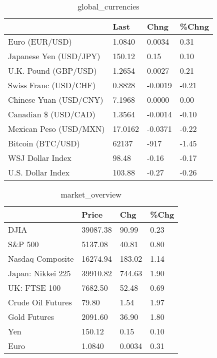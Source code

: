 \documentclass{article}%
\begin{document}
%


\begin{table}[htbp]%
\caption{global\_currencies}%
\centering%
\begin{adjustbox}{width=1\textwidth}%
\begin{tabular}{llll}
\toprule
                       &    Last &    Chng & \%Chng \\
\midrule
        Euro (EUR/USD) &  1.0840 &  0.0034 &  0.31 \\
Japanese Yen (USD/JPY) &  150.12 &    0.15 &  0.10 \\
  U.K. Pound (GBP/USD) &  1.2654 &  0.0027 &  0.21 \\
 Swiss Franc (USD/CHF) &  0.8828 & -0.0019 & -0.21 \\
Chinese Yuan (USD/CNY) &  7.1968 &  0.0000 &  0.00 \\
  Canadian \$ (USD/CAD) &  1.3564 & -0.0014 & -0.10 \\
Mexican Peso (USD/MXN) & 17.0162 & -0.0371 & -0.22 \\
     Bitcoin (BTC/USD) &   62137 &    -917 & -1.45 \\
      WSJ Dollar Index &   98.48 &   -0.16 & -0.17 \\
     U.S. Dollar Index &  103.88 &   -0.27 & -0.26 \\
\bottomrule
\end{tabular}
%
\end{adjustbox}%
\end{table}

%


\begin{table}[htbp]%
\caption{market\_overview}%
\centering%
\begin{adjustbox}{width=1\textwidth}%
\begin{tabular}{llll}
\toprule
                  &    Price &    Chg & \%Chg \\
\midrule
             DJIA & 39087.38 &  90.99 & 0.23 \\
          S\&P 500 &  5137.08 &  40.81 & 0.80 \\
 Nasdaq Composite & 16274.94 & 183.02 & 1.14 \\
Japan: Nikkei 225 & 39910.82 & 744.63 & 1.90 \\
     UK: FTSE 100 &  7682.50 &  52.48 & 0.69 \\
Crude Oil Futures &    79.80 &   1.54 & 1.97 \\
     Gold Futures &  2091.60 &  36.90 & 1.80 \\
              Yen &   150.12 &   0.15 & 0.10 \\
             Euro &   1.0840 & 0.0034 & 0.31 \\
\bottomrule
\end{tabular}
%
\end{adjustbox}%
\end{table}

%
\end{document}
